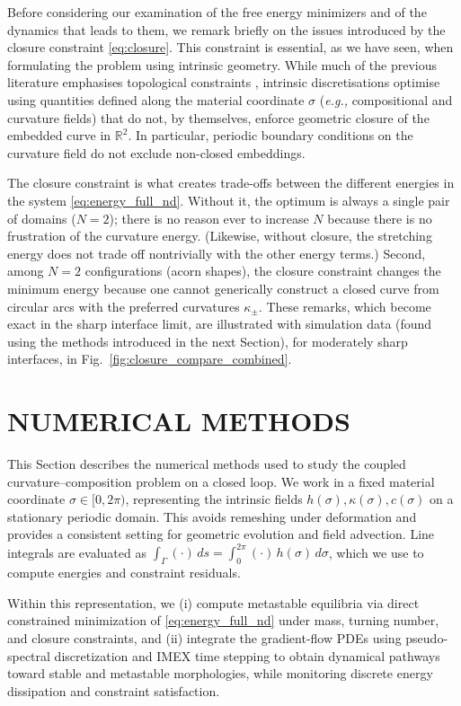 \documentclass[
aip,
jcp,
reprint, 
floatfix
]{revtex4-1}
\begin{document}
Before considering our examination of the free energy minimizers and of the dynamics that leads to them, we remark briefly on the issues introduced by the closure constraint  \eqref{eq:closure}. This constraint is essential, as we have seen, when formulating the problem using intrinsic geometry. While much of the previous literature emphasises topological constraints \cite{elliott2021domain}, intrinsic discretisations optimise using quantities defined along the material coordinate $\sigma$ ({\em e.g.,} compositional and curvature fields) that do not, by themselves, enforce geometric closure of the embedded curve in $\mathbb{R}^2$. In particular, periodic boundary conditions on the curvature field do not exclude non-closed embeddings.

The closure constraint is what creates trade-offs between the different energies in the system \eqref{eq:energy_full_nd}. Without it, the optimum is always a single pair of domains ($N=2$); there is no reason ever to increase $N$ because there is no frustration of the curvature energy. (Likewise, without closure, the stretching energy does not trade off nontrivially with the other energy terms.) Second, among $N=2$ configurations (acorn shapes), the closure constraint changes the minimum energy because one cannot generically construct a closed curve from circular arcs with the preferred curvatures $\kappa_\pm$. 
These remarks, which become exact in the sharp interface limit, are illustrated with simulation data (found using the methods introduced in the next Section), for moderately sharp interfaces, in Fig.~\ref{fig:closure_compare_combined}. 


\section{NUMERICAL METHODS} \label{sec: numerical}

This Section describes the numerical methods used to study the coupled curvature--composition problem on a closed loop. We work in a fixed material coordinate $\sigma\in[0,2\pi)$, representing the intrinsic fields $h(\sigma),\kappa(\sigma),c(\sigma)$ on a stationary periodic domain. This avoids remeshing under deformation and provides a consistent setting for geometric evolution and field advection. Line integrals are evaluated as $\int_{\Gamma}(\cdot)\,ds=\int_0^{2\pi}(\cdot)\,h(\sigma)\,d\sigma$, which we use to compute energies and constraint residuals.

Within this representation, we (i) compute metastable equilibria via direct constrained minimization of \eqref{eq:energy_full_nd} under mass, turning number, and closure constraints, and (ii) integrate the gradient-flow PDEs using pseudo-spectral discretization and IMEX time stepping to obtain dynamical pathways toward stable and metastable morphologies, while monitoring discrete energy dissipation and constraint satisfaction.
\end{document}
